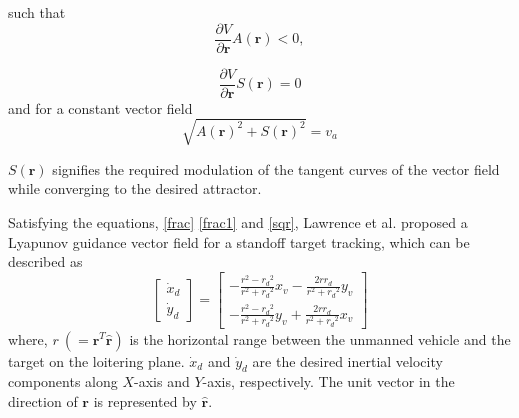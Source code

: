 \documentclass[Afour,sagev,times]{sagej}
\begin{document}
such that 
\begin{equation}\label{frac}
\frac{\partial V}{\partial \boldsymbol{r}}A(\boldsymbol{r})<0,
\end{equation}  

\begin{equation}\label{frac1}
\frac{\partial V}{\partial \boldsymbol{r}}S(\boldsymbol{r})=0
\end{equation}
and for a constant vector field
\begin{equation}\label{sqr}
\sqrt{A(\boldsymbol{r})^{2}+S(\boldsymbol{r})^{2}}=v_a
\end{equation}

$S(\boldsymbol{r})$ signifies the required modulation of the tangent curves of the vector field while converging to the desired attractor. 


Satisfying the equations, \eqref{frac} \eqref{frac1} and \eqref{sqr}, Lawrence et al. \cite{lawrence2003lyapunov} proposed a Lyapunov guidance vector field for a standoff target tracking, which can be described as
\begin{equation}
\left[ {\begin{array}{*{20}{c}}
	{\dot{x}_{d} } \\ 
	{\dot{y}_{d} } 
	\end{array}} \right] = \left[ {\begin{array}{*{20}{c}}
	{ - \frac{{{r^2} - {r_d}^2}}{{{r^2} + {r_d}^2}}x_v - \frac{{2r{r_d}}}{{{r^2} + {r_d}^2}}y_v} \\ 
	{ - \frac{{{r^2} - {r_d}^2}}{{{r^2} + {r_d}^2}}y_v + \frac{{2r{r_d}}}{{{r^2} + {r_d}^2}}x_v} 
	\end{array}} \right]
\end{equation} where,  $r~ (= {{\boldsymbol{r}}^T}{\boldsymbol{\hat r}}) $ is the horizontal range between the unmanned vehicle and the target on the loitering plane. $\dot{x}_{d}$ and $\dot{y}_{d}$ are the desired inertial velocity components along  $X$-axis and $Y$-axis, respectively. The unit vector in the direction of $\boldsymbol{r}$ is represented by $\hat{\boldsymbol{r}}$.
\end{document}
